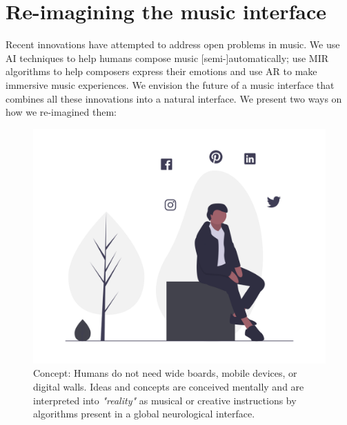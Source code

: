 \documentclass[acmtog]{acmart}
\begin{document}

\section{Re-imagining the music interface}
Recent innovations have attempted to address open problems in music. We use AI techniques to help humans compose music [semi-]automatically; use MIR algorithms to help composers express their emotions and use AR to make immersive music experiences. We envision the future of a music interface that combines all these innovations into a natural interface. We present two ways on how we re-imagined them: 

\begin{figure}[h]
  \centering
  \includegraphics[width=\linewidth]{acmart-master-2/samples/thinkbnw.png}
  \caption{Concept: Humans do not need wide boards, mobile devices, or digital walls. Ideas and concepts are conceived mentally and are interpreted into \textit{"reality"} as musical or creative instructions by algorithms present in a global neurological interface. }
  \label{fig: think}
\end{figure}
\end{document}
